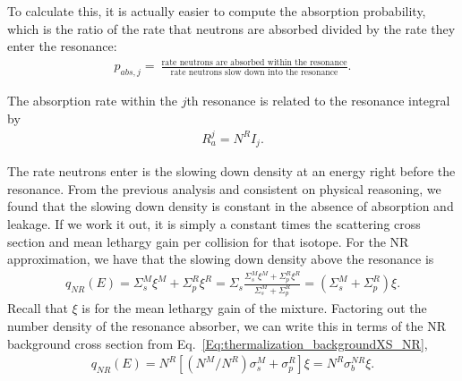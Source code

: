 To calculate this, it is actually easier to compute the absorption probability, which is the ratio of the rate that neutrons are absorbed divided by the rate they enter the resonance:
\begin{align}
  p_{abs,j} = \ \frac{\text{rate neutrons are absorbed within the resonance}}{\text{rate neutrons slow down into the resonance}} . \nonumber
\end{align}

The absorption rate within the $j$th resonance is related to the resonance integral by
\begin{align}
  R_a^j = N^R I_j .
\end{align}

The rate neutrons enter is the slowing down density at an energy right before the resonance. From the previous analysis and consistent on physical reasoning, we found that the slowing down density is constant in the absence of absorption and leakage. If we work it out, it is simply a constant times the scattering cross section and mean lethargy gain per collision for that isotope. For the NR approximation, we have that the slowing down density above the resonance is
\begin{align}
  q_{NR}(E) = \Sigma_s^M \xi^M + \Sigma_p^R \xi^R = \Sigma_s \frac{ \Sigma_s^M \xi^M + \Sigma_p^R \xi^R }{ \Sigma_s^M + \Sigma_p^R } = ( \Sigma_s^M + \Sigma_p^R ) \xi .
\end{align}
Recall that $\xi$ is for the mean lethargy gain of the mixture. Factoring out the number density of the resonance absorber, we can write this in terms of the NR background cross section from Eq.~\eqref{Eq:thermalization_backgroundXS_NR},
\begin{align}
  q_{NR}(E) =  N^R [ (N^M/N^R) \sigma_s^M + \sigma_p^R]  \xi = N^R \sigma_b^{NR} \xi.
\end{align}

